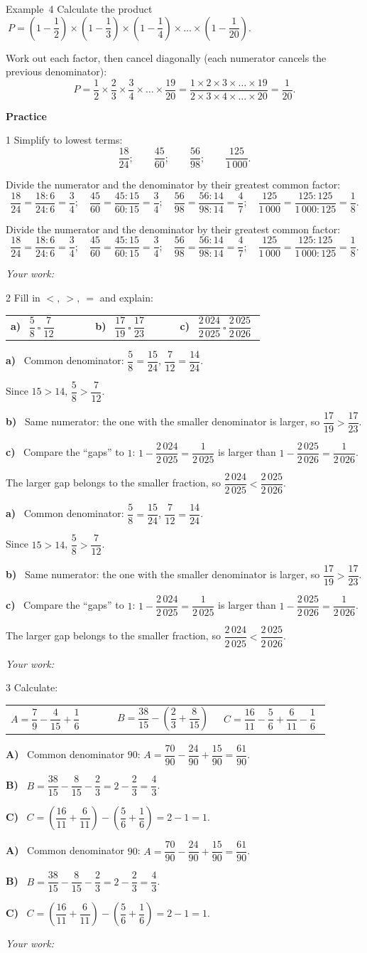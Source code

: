 \documentclass[11pt]{article}
\makeatletter
\newif\ifsol \soltrue
\renewcommand{\arraystretch}{1.35}
\newcommand{\guide}{\par\vspace{4pt}{\bfseries\color{tmBlue}\GuideWord}\par\vspace{3pt}\nopagebreak}
\newcommand{\probsol}[1]{%
  \begin{lrbox}{\solmeasure}\begin{minipage}{\dimexpr\linewidth-24pt\relax}#1\end{minipage}\end{lrbox}%
  \ifsol
    \begin{solbox}#1\end{solbox}%
  \else
    \setlength{\solht}{\dimexpr\ht\solmeasure+\dp\solmeasure+0.85cm\relax}%
    \ifdim\solht<1.35cm\setlength{\solht}{1.35cm}\fi
    \begin{tcolorbox}[colback=white,colframe=Line,boxrule=0.8pt,arc=5pt,
      left=8pt,right=8pt,top=4pt,bottom=4pt,height=\solht]{\footnotesize\color{Slate}\itshape\WorkWord}\end{tcolorbox}%
  \fi}
\newcommand{\dividerbar}[1]{\par\vspace{0.6em}\noindent
  \begin{tcolorbox}[enhanced,frame hidden,interior hidden,borderline west={5pt}{0pt}{ProbBlue},
    colback=white,left=12pt,right=12pt,top=5pt,bottom=5pt,arc=4pt]
  {\large\bfseries\color{ProbBlue} #1}\end{tcolorbox}\vspace{0.4em}}
\newcommand{\pa}[1]{\textbf{#1)}\ }
\newenvironment{cols3}{\par\vspace{3pt}\noindent\setlength{\tabcolsep}{0pt}\renewcommand{\arraystretch}{1.3}%
  \begin{tabular}{@{}>{\raggedright\arraybackslash\rule{0pt}{4.4ex}}p{0.32\linewidth}<{\rule[-2.3ex]{0pt}{0pt}}@{\hspace{0.015\linewidth}}>{\raggedright\arraybackslash\rule{0pt}{4.4ex}}p{0.32\linewidth}<{\rule[-2.3ex]{0pt}{0pt}}@{\hspace{0.015\linewidth}}>{\raggedright\arraybackslash\rule{0pt}{4.4ex}}p{0.32\linewidth}<{\rule[-2.3ex]{0pt}{0pt}}@{}}}%
  {\end{tabular}\par}
\newcommand{\gap}{\vspace{0.3cm}}
\def\GuideWord{Guided solution.}
\def\WorkWord{Your work:}
\def\ExWord{Example}
\makeatother
\begin{document}
\gap
\begin{exbox}{\ExWord\ 4}
Calculate the product $\ P=\left(1-\dfrac12\right)\times\left(1-\dfrac13\right)\times\left(1-\dfrac14\right)\times\dots\times\left(1-\dfrac1{20}\right)$.
\guide
Work out each factor, then cancel diagonally (each numerator cancels the previous denominator):
\[P=\frac12\times\frac23\times\frac34\times\dots\times\frac{19}{20}=\frac{1\times2\times3\times\dots\times19}{2\times3\times4\times\dots\times20}=\frac1{20}.\]
\end{exbox}
\dividerbar{Practice}
\begin{probbox}{1}{\relax}
Simplify to lowest terms:
\[\frac{18}{24};\qquad\frac{45}{60};\qquad\frac{56}{98};\qquad\frac{125}{1\,000}.\]
\end{probbox}
\probsol{
Divide the numerator and the denominator by their greatest common factor:
\[\frac{18}{24}=\frac{18:6}{24:6}=\frac34;\quad\frac{45}{60}=\frac{45:15}{60:15}=\frac34;\quad\frac{56}{98}=\frac{56:14}{98:14}=\frac47;\quad\frac{125}{1\,000}=\frac{125:125}{1\,000:125}=\frac18.\]
}
\gap
\begin{probbox}{2}{\relax}
Fill in $<,\ >,\ =$ and explain:
\begin{cols3}
\pa{a} $\dfrac58\ \square\ \dfrac7{12}$ & \pa{b} $\dfrac{17}{19}\ \square\ \dfrac{17}{23}$ & \pa{c} $\dfrac{2\,024}{2\,025}\ \square\ \dfrac{2\,025}{2\,026}$
\end{cols3}
\end{probbox}
\probsol{
\pa{a} Common denominator: $\dfrac58=\dfrac{15}{24}$, $\dfrac7{12}=\dfrac{14}{24}$.\par Since $15>14$, $\dfrac58>\dfrac7{12}$.\par
\pa{b} Same numerator: the one with the smaller denominator is larger, so $\dfrac{17}{19}>\dfrac{17}{23}$.\par
\pa{c} Compare the ``gaps'' to $1$: $1-\dfrac{2\,024}{2\,025}=\dfrac1{2\,025}$ is larger than $1-\dfrac{2\,025}{2\,026}=\dfrac1{2\,026}$.\par The larger gap belongs to the smaller fraction, so $\dfrac{2\,024}{2\,025}<\dfrac{2\,025}{2\,026}$.
}
\gap
\begin{probbox}{3}{\relax}
Calculate:
\begin{cols3}
$A=\dfrac79-\dfrac4{15}+\dfrac16$ & $B=\dfrac{38}{15}-\left(\dfrac23+\dfrac8{15}\right)$ & $C=\dfrac{16}{11}-\dfrac56+\dfrac6{11}-\dfrac16$
\end{cols3}
\end{probbox}
\probsol{
\pa{A} Common denominator $90$: $A=\dfrac{70}{90}-\dfrac{24}{90}+\dfrac{15}{90}=\dfrac{61}{90}$.\par
\pa{B} $B=\dfrac{38}{15}-\dfrac8{15}-\dfrac23=2-\dfrac23=\dfrac43$.\par
\pa{C} $C=\left(\dfrac{16}{11}+\dfrac6{11}\right)-\left(\dfrac56+\dfrac16\right)=2-1=1$.
}
\end{document}
